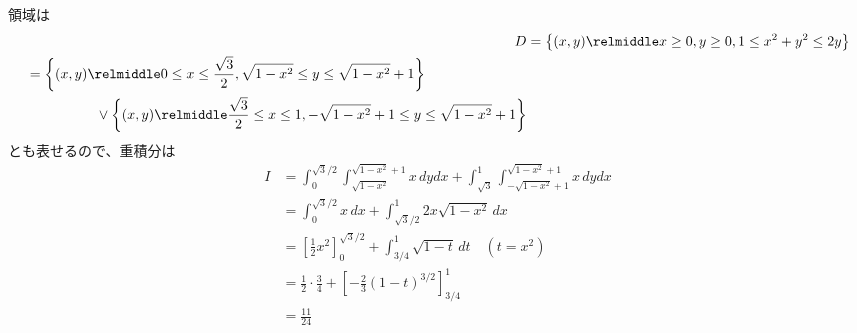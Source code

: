 \begin{other*}
  領域は
  \begin{align}
    D
    &= \left\{(x,y)\relmiddle x\geq 0, y\geq 0, 1\leq x^2 + y^2\leq 2y\right\} \\
    \begin{split}
      &= \left\{(x,y)\relmiddle 0\leq x\leq \frac{\sqrt{3}}{2}, \sqrt{1-x^2}\leq y\leq \sqrt{1-x^2}+1 \right\} \\
      &\hspace*{50pt} \vee \left\{(x,y)\relmiddle \frac{\sqrt{3}}{2}\leq x\leq 1, -\sqrt{1-x^2}+1\leq y\leq \sqrt{1-x^2}+1 \right\}
    \end{split}
  \end{align}
  とも表せるので、重積分は
  \begin{align}
    I
    &= \int_{0}^{\sqrt{3}/2}\int_{\sqrt{1-x^2}}^{\sqrt{1-x^2}+1} x\,dydx
       + \int_{\sqrt{3}}^{1}\int_{-\sqrt{1-x^2}+1}^{\sqrt{1-x^2}+1}x\,dydx \\
    &= \int_{0}^{\sqrt{3}/2} x \,dx + \int_{\sqrt{3}/2}^{1}2x\sqrt{1-x^2}\,dx \\
    &= \left[\frac{1}{2}x^2\right]_{0}^{\sqrt{3}/2} + \int_{3/4}^{1}\sqrt{1-t}\,dt \quad(t=x^2) \\
    &= \frac{1}{2}\cdot\frac{3}{4} + \left[-\frac{2}{3}(1-t)^{3/2}\right]_{3/4}^{1} \\
    &= \frac{11}{24}
  \end{align}
\end{other*}


\newpage
